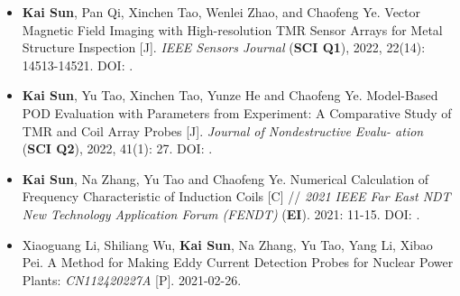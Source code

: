       \begin{itemize}[leftmargin=1.5em]
            \item \textbf{Kai Sun}, Pan Qi, Xinchen Tao, Wenlei Zhao, and Chaofeng Ye. Vector Magnetic Field Imaging with High-resolution TMR Sensor Arrays for Metal Structure Inspection [J]. \textsl{IEEE Sensors Journal} (\textbf{SCI Q1}), 2022, 22(14): 14513-14521. DOI: .
                  \\{ \footnotesize {}}

            \item \textbf{Kai Sun}, Yu Tao, Xinchen Tao, Yunze He and Chaofeng Ye. Model-Based POD Evaluation with Parameters from Experiment: A Comparative Study of TMR and Coil Array Probes [J]. \textsl{Journal of Nondestructive Evalu- ation} (\textbf{SCI Q2}), 2022, 41(1): 27. DOI: .
                  \\{ \footnotesize {}}

            \item \textbf{Kai Sun}, Na Zhang, Yu Tao and Chaofeng Ye. Numerical Calculation of Frequency Characteristic of Induction Coils [C] // \textsl{2021 IEEE Far East NDT New Technology Application Forum (FENDT)} (\textbf{EI}). 2021: 11-15. DOI: .
                  \\{ \footnotesize {}}

            \item Xiaoguang Li, Shiliang Wu, \textbf{Kai Sun}, Na Zhang, Yu Tao, Yang Li, Xibao Pei. A Method for Making Eddy Current Detection Probes for Nuclear Power Plants: \textsl{CN112420227A} [P]. 2021-02-26.
      \end{itemize}
\fi
